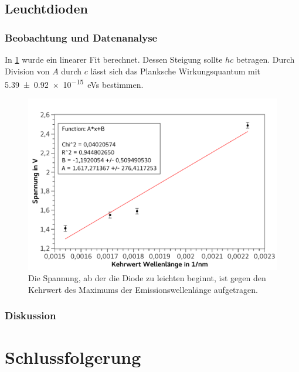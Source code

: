 \documentclass[
	a4paper,
	12pt,
	pagesize,
	ngerman
]{scrartcl}
\begin{document}
	\subsection{Leuchtdioden}
	\subsubsection{Beobachtung und Datenanalyse}
	In \cref{fig_led} wurde ein linearer Fit berechnet. 
	Dessen Steigung sollte $hc$ betragen.
	Durch Division von $A$ durch $c$ lässt sich das Planksche Wirkungsquantum mit \SI{5,39 +- 0,92 e-15}{eVs} bestimmen.

	\begin{figure}[H] %
		\includegraphics[width=1\textwidth]{fig_led} 
		\centering
		\caption{Die Spannung, ab der die Diode zu leichten beginnt, ist gegen den Kehrwert des Maximums der Emissionswellenlänge aufgetragen.}
		\label{fig_led}
		\centering
	\end{figure}	

	
	\subsubsection{Diskussion}
	
	
	
	
	\section{Schlussfolgerung}
	
\end{document}
